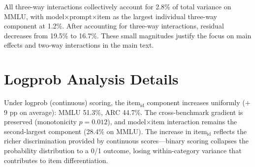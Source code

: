 \documentclass[letterpaper,11pt]{article}
\begin{document}
All three-way interactions collectively account for 2.8\% of total variance on MMLU, with model$\times$prompt$\times$item as the largest individual three-way component at 1.2\%.
After accounting for three-way interactions, residual decreases from 19.5\% to 16.7\%.
These small magnitudes justify the focus on main effects and two-way interactions in the main text.

\section{Logprob Analysis Details}

Under logprob (continuous) scoring, the item$_{\text{id}}$ component increases uniformly ($+$9 pp on average): MMLU 51.3\%, ARC 44.7\%.
The cross-benchmark gradient is preserved (monotonicity $p = 0.012$), and model$\times$item interaction remains the second-largest component (28.4\% on MMLU).
The increase in item$_{\text{id}}$ reflects the richer discrimination provided by continuous scores---binary scoring collapses the probability distribution to a 0/1 outcome, losing within-category variance that contributes to item differentiation.
\end{document}
